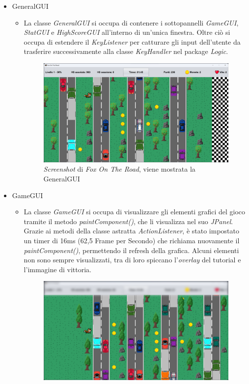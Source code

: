 \documentclass[12pt,a4paper]{report}
\begin{document}
\begin{itemize}
	\item GeneralGUI
	\begin{itemize}
		\item La classe \emph{GeneralGUI} si occupa di contenere i sottopannelli \emph{GameGUI}, \emph{StatGUI} e \emph{HighScoreGUI} all'interno di un'unica finestra. Oltre ciò si occupa di estendere il \emph{KeyListener} per catturare gli input dell'utente da trasferire successivamente alla classe \emph{KeyHandler} nel package \emph{Logic}.
		\begin{figure}[H]
			\centering
			\includegraphics[width=1\textwidth, trim=2 2 2 2, clip]{GeneralGUI.png}
			\caption{\emph{Screenshot} di \emph{Fox On The Road}, viene mostrata la GeneralGUI}
			\label{fig:GeneralGUI}
		\end{figure}
	\end{itemize}
	\item GameGUI
	\begin{itemize}
		\item La classe \emph{GameGUI} si occupa di visualizzare gli elementi grafici del gioco tramite il metodo \emph{paintComponent()}, che li visualizza nel suo \emph{JPanel}. Grazie ai metodi della classe astratta \emph{ActionListener}, è stato impostato un timer di 16ms (62,5 Frame per Secondo) che richiama nuovamente il \emph{paintComponent()}, permettendo il refresh della grafica. Alcuni elementi non sono sempre visualizzati, tra di loro spiccano l'\emph{overlay} del tutorial e l'immagine di vittoria.
		\begin{figure}[H]
			\centering
			\includegraphics[width=1\textwidth, trim=2 2 2 2, clip]{GameGUI.png}

\end{figure}
\end{itemize}
\end{itemize}
\end{document}
